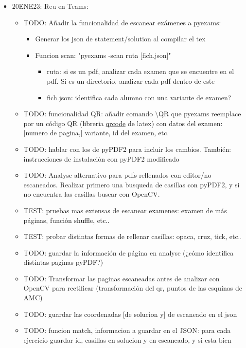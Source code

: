 \begin{itemize}
    
    
    \item 20ENE23: Reu en Teams:
    \begin{itemize}
        \item TODO: Añadir la funcionalidad de escanear exámenes a pyexams:
        \begin{itemize}
            \item Generar los json de statement/solution al compilar el tex
            \item Funcion scan: "pyexams -scan ruta [fich.json]"
            \begin{itemize}
                \item ruta: si es un pdf, analizar cada examen que se encuentre en el pdf. Si es un directorio, analizar cada pdf dentro de este
                \item fich.json: identifica cada alumno con una variante de examen?
            \end{itemize}
        \end{itemize}
        \item TODO: funcionalidad QR: añadir comando \textbackslash{QR} que pyexams reemplace por un código QR (libreria \href{https://ctan.org/pkg/qrcode}{qrcode} de latex) con datos del examen: [numero de pagina,] variante, id del examen, etc.
        \item TODO: hablar con los de pyPDF2 para incluir los cambios. También: instrucciones de instalación con pyPDF2 modificado
        \item TODO: Analyse alternativo para pdfs rellenados con editor/no escaneados. Realizar primero una busqueda de casillas con pyPDF2, y si no encuentra las casillas buscar con OpenCV.
        \item TEST: pruebas mas extensas de escanear examenes: examen de más páginas, función shuffle, etc..
        \item TEST: probar distintas formas de rellenar casillas: opaca, cruz, tick, etc..
        \item TODO: guardar la información de página en analyse (¿cómo identifica distintas paginas pyPDF?)
        \item TODO: Transformar las paginas escaneadas antes de analizar con OpenCV para rectificar (transformación del qr, puntos de las esquinas de AMC)
        \item TODO: guardar las coordenadas [de solucion y] de escaneado en el json
        \item TODO: funcion match, informacion a guardar en el JSON: para cada ejercicio guardar id, casillas en solucion y en escaneado, y si esta bien

\end{itemize}
\end{itemize}
